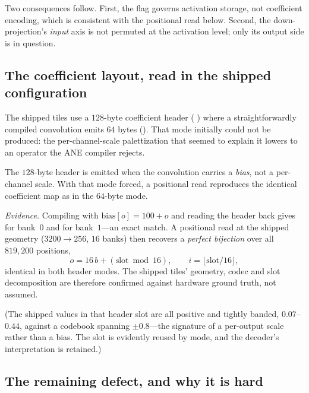 Two consequences follow. First, the flag governs activation storage, not coefficient encoding, which
is consistent with the positional read below. Second, the down-projection's \emph{input} axis is not
permuted at the activation level; only its output side is in question.

\subsection{The coefficient layout, read in the shipped configuration}

The shipped tiles use a $128$-byte coefficient header ( ) where a
straightforwardly compiled convolution emits $64$ bytes (). That mode initially could
not be produced: the per-channel-scale palettization that seemed to explain it lowers to an operator
the ANE compiler rejects.

\begin{finding}\label{find:bias}
The $128$-byte header is emitted when the convolution carries a \emph{bias}, not a per-channel scale.
With that mode forced, a positional read reproduces the identical coefficient map as in the
$64$-byte mode.
\end{finding}
\noindent\emph{Evidence.} Compiling with $\mathrm{bias}[o]=100+o$ and reading the header back gives
 for bank~$0$ and  for bank~$1$---an exact match. A
positional read at the shipped geometry ($3200\to256$, $16$ banks) then recovers a \emph{perfect
bijection} over all $819{,}200$ positions,
\[
  o = 16\,b + (\mathrm{slot} \bmod 16), \qquad i = \lfloor \mathrm{slot}/16 \rfloor,
\]
identical in both header modes. The shipped tiles' geometry, codec and slot decomposition are
therefore confirmed against hardware ground truth, not assumed.

(The shipped values in that header slot are all positive and tightly banded, $0.07$--$0.44$, against
a codebook spanning $\pm0.8$---the signature of a per-output scale rather than a bias. The slot is
evidently reused by mode, and the decoder's interpretation is retained.)

\subsection{The remaining defect, and why it is hard}

